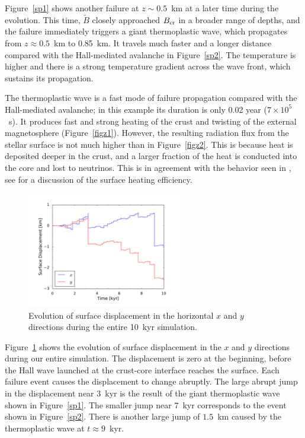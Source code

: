 Figure~\ref{sp1} shows another failure at $z\sim 0.5$~km at a later time during the evolution. 
This time, $\tilde{B}$ closely approached $B_{\rm cr}$ in a broader range of depths, and the failure immediately triggers a giant thermoplastic wave, which propagates from $z\approx 0.5$~km to 0.85~km. 
It travels much faster and a longer distance compared with the Hall-mediated avalanche in Figure~\ref{sp2}. 
The temperature is higher and there is a strong temperature gradient across the wave front, which sustains its propagation.

The thermoplastic wave is a fast mode of failure propagation compared with the Hall-mediated avalanche; in this example its duration is only 0.02 year ($7\times 10^5$~s). 
It produces fast and strong heating of the crust and twisting of the external magnetosphere (Figure~\ref{figz1}). 
However, the resulting radiation flux from the stellar surface is not much higher than in Figure~\ref{figz2}.
This is because heat is deposited deeper in the crust, and a larger fraction of the heat is conducted into the core and lost to neutrinos.
This is in agreement with the behavior seen in \citet{2006MNRAS.371..477K,2014MNRAS.442.3484K}, see \citet{2016ApJ...833..261B} for a discussion of the surface heating efficiency.

\begin{figure}[h]
\centering
\includegraphics[width=0.6\textwidth]{pics/chap2/dis.pdf} 
\caption[Evolution of surface displacement]{Evolution of surface displacement in the horizontal $x$ and $y$ directions during the entire 10~kyr simulation.}
\label{dis}
\end{figure}

Figure~\ref{dis} shows the evolution of surface displacement in the $x$ and $y$ directions during our entire simulation. 
The displacement is zero at the beginning, before the Hall wave launched at the crust-core interface reaches the surface. 
Each failure event causes the displacement to change abruptly. The large abrupt jump in the displacement near $3$~kyr is the result of the giant thermoplastic wave shown in Figure~\ref{sp1}. 
The smaller jump near $7$~kyr corresponds to the event shown in Figure~\ref{sp2}. 
There is another large jump of $1.5$~km caused by the thermoplastic wave at $t\approx 9$~kyr.

